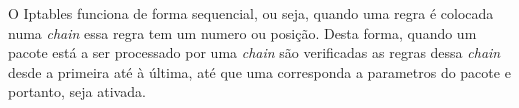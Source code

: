 
O Iptables funciona de forma sequencial, ou seja, quando uma regra é colocada
numa \textit{chain} essa regra tem um numero ou posição. Desta forma, quando um 
pacote está a ser processado por uma \textit{chain} são verificadas as regras 
dessa \textit{chain} desde a primeira até à última, até que uma corresponda a
parametros do pacote e portanto, seja ativada. \\



\begin{comment}

Numa regra é possivel especificar parametros como a interface de entrada, 
a interface de saída, IP de destino, IP de origem,o protocolo, a porta de 
origem, porta de destino e ação a tomar na regra (aceitar, rejeitar, descartar).

A seguite tabela \ref{ipt3args} mostra uma lista mais completa de parametros a usar na
criação de regras do IPTables:

\begin{table}[H]
\centering
\begin{tabular}{|c|c|}
\hline
\multicolumn{2}{|c|}{Parametros}\\
\hline
\textbf{Prametro} & \textbf{sintaxe} \\
\hline
table & -t nome da table \\
\hline
posição da regra na chain & \textbf{-I} para o topo e \textbf{-A} para o fundo da lista \\
\hline
Chain & INPUT, OUTPUT, FORWARD, PREROUTING, POSTROUTING \\
\hline
protocolo & \textbf{-p} nome do protocolo  \\
\hline
ip de origem & \textbf{-s} endereço IP  \\
\hline
ip de destino & \textbf{-d} endereço IP  \\
\hline
porta de origem & \textbf{--sport} porta  \\
\hline
porta de destino & \textbf{--dport} porta  \\
\hline
ação & \textbf{-j} ACCEPT/REJECT/DROP  \\
\hline
\end{tabular}
\caption{Parametros possiveis na criação de regras.}
\label{ipt3args}
\end{table}
    
Segue agora um exemplo de uma regra para a tabela \textit{Filter} na 
\textit{INPUT Chain} para negar o tráfego de entrada para a porta 22:

\begin{lstlisting}[language=Bash, caption={exemplo de comando}]
iptabels -I INPUT -p tcp --dport 22 -j DROP
\end{lstlisting}

\textbf{Nota}: Não é necessário especificar no comando a tabela  com o parametro
\textbf{-t} quando se quer adicionar uma regra na \textit{Filter Table}.

\end{comment}


